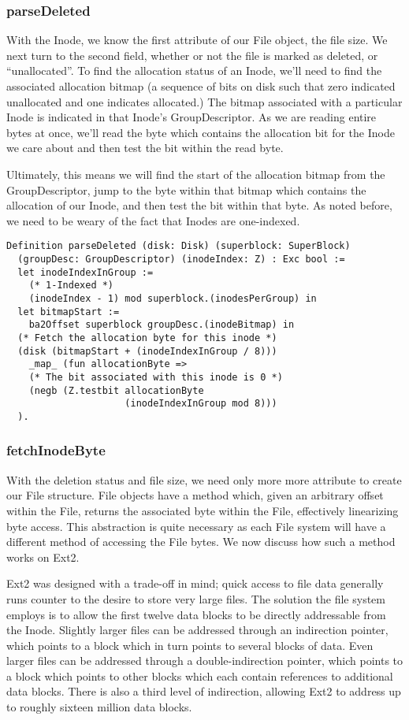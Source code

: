 \documentclass[nocopyrightspace]{sigplanconf}
\begin{document}
\subsubsection{parseDeleted}
With the Inode, we know the first attribute of our File object, the file size.
We next turn to the second field, whether or not the file is marked as
deleted, or ``unallocated''. To find the allocation status of an Inode, we'll
need to find the associated allocation bitmap (a sequence of bits on disk such
that zero indicated unallocated and one indicates allocated.) The bitmap
associated with a particular Inode is indicated in that Inode's
GroupDescriptor. As we are reading entire bytes at once, we'll read the byte
which contains the allocation bit for the Inode we care about and then test
the bit within the read byte.

Ultimately, this means we will find the start of the allocation bitmap from
the GroupDescriptor, jump to the byte within that bitmap which contains the
allocation of our Inode, and then test the bit within that byte. As noted
before, we need to be weary of the fact that Inodes are one-indexed.


\begin{lstlisting}
Definition parseDeleted (disk: Disk) (superblock: SuperBlock)
  (groupDesc: GroupDescriptor) (inodeIndex: Z) : Exc bool :=
  let inodeIndexInGroup := 
    (* 1-Indexed *)
    (inodeIndex - 1) mod superblock.(inodesPerGroup) in
  let bitmapStart := 
    ba2Offset superblock groupDesc.(inodeBitmap) in
  (* Fetch the allocation byte for this inode *)
  (disk (bitmapStart + (inodeIndexInGroup / 8))) 
    _map_ (fun allocationByte =>
    (* The bit associated with this inode is 0 *)
    (negb (Z.testbit allocationByte 
                     (inodeIndexInGroup mod 8)))
  ).
\end{lstlisting}

\subsubsection{fetchInodeByte}
With the deletion status and file size, we need only more more attribute to
create our File structure. File objects have a method which, given an
arbitrary offset within the File, returns the associated byte within the File,
effectively linearizing byte access. This abstraction is quite necessary as
each File system will have a different method of accessing the File bytes. We
now discuss how such a method works on Ext2.

Ext2 was designed with a trade-off in mind; quick access to file data
generally runs counter to the desire to store very large files. The solution
the file system employs is to allow the first twelve data blocks to be
directly addressable from the Inode. Slightly larger files can be addressed
through an indirection pointer, which points to a block which in turn points
to several blocks of data. Even larger files can be addressed through a
double-indirection pointer, which points to a block which points to other
blocks which each contain references to additional data blocks. There is also
a third level of indirection, allowing Ext2 to address up to roughly sixteen
million data blocks.
\end{document}
